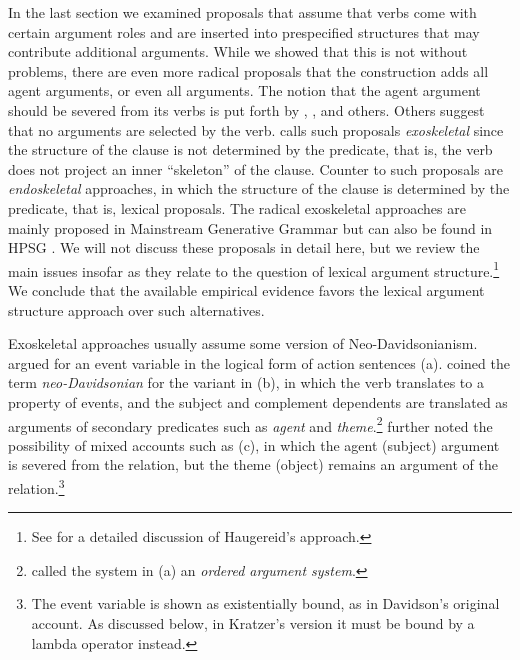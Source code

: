 \largerpage
In the last section we examined proposals that assume that verbs come with certain argument roles
and are inserted into prespecified structures that may contribute additional arguments. While we
showed that this is not without problems, there are even more radical proposals that the
construction adds all agent arguments, or even all arguments.  The notion that the agent argument
should be severed from its verbs is put forth by \citet{Marantz84a, Marantz97a}, \citet{Kratzer96a},
\citet{Embick2004a} and others.  Others suggest that no arguments are selected by the verb.
\citet{Borer2003a-u} calls such proposals \emph{exoskeletal} since the structure of the clause is
not determined by the predicate, that is, the verb does not project an inner ``skeleton'' of the
clause.  Counter to such proposals are \emph{endoskeletal} approaches, in which the structure of the
clause is determined by the predicate, that is, lexical proposals.  The radical exoskeletal
approaches are mainly proposed in Mainstream Generative Grammar
\citep{Borer94a-u,Borer2003a-u,Borer2005a-u,Schein93a-u,HK97a-u,Lohndal2012a} but can also be found
in HPSG \citep{Haugereid2009a}.  We will not discuss these proposals in detail here, but we review
the main issues insofar as they relate to the question of lexical argument structure.\footnote{
  See  for a detailed discussion of Haugereid's approach.%
} We conclude that the available empirical evidence favors the lexical argument structure approach over such
alternatives.

Exoskeletal approaches usually assume some version of Neo-Davidsonianism. \citet{Davidson67a-u}
argued for an event variable in the logical form of action sentences (a).
\citet{Dowty89b-u} coined the term \emph{neo-Davidsonian} for the variant in (b), in which
the verb translates to a property of events, and the subject and complement dependents are
translated as arguments of secondary predicates such as \emph{agent} and
\emph{theme}.\footnote{
\citet{Dowty89b-u} called the system in (a) an \emph{ordered argument system}.
} \citet{Kratzer96a} further noted the possibility of mixed accounts such as (c),
in which the agent (subject) argument is severed from the  relation, but the theme (object) remains an
argument of the  relation.\footnote{%
  The event variable is shown as existentially bound, as in Davidson's original account.  
  As discussed below, in Kratzer's version it must be bound by a lambda operator instead.} 

